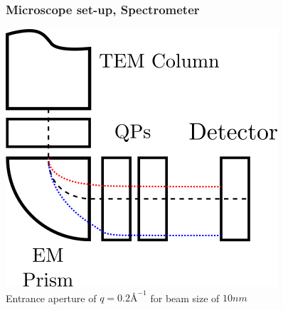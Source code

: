 \documentclass{beamer}
\begin{document}
\begin{frame}
	\frametitle{Microscope set-up, Spectrometer}
	\centering
	\includegraphics[width=0.6\linewidth, keepaspectratio]{Figures/prism.png}\\
	\vspace{0.5cm}
	Entrance aperture of $q=0.2 \si{\angstrom}^{-1}$ for beam size of $10nm$

\end{frame}
\end{document}
